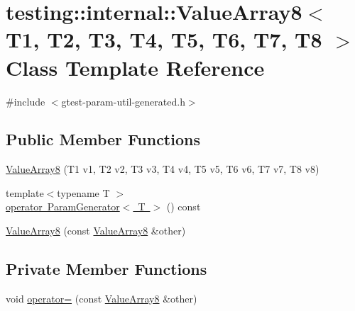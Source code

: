 \hypertarget{classtesting_1_1internal_1_1_value_array8}{}\section{testing\+::internal\+::Value\+Array8$<$ T1, T2, T3, T4, T5, T6, T7, T8 $>$ Class Template Reference}
\label{classtesting_1_1internal_1_1_value_array8}


{\ttfamily \#include $<$gtest-\/param-\/util-\/generated.\+h$>$}

\subsection*{Public Member Functions}
\begin{DoxyCompactItemize}
\item 
\mbox{\hyperlink{classtesting_1_1internal_1_1_value_array8_aa935d771149e26694277b6b9a3f6f5d3}{Value\+Array8}} (T1 v1, T2 v2, T3 v3, T4 v4, T5 v5, T6 v6, T7 v7, T8 v8)
\item 
{\footnotesize template$<$typename T $>$ }\\\mbox{\hyperlink{classtesting_1_1internal_1_1_value_array8_a265f6e8bc6ceede7e673682ddebb82c5}{operator Param\+Generator$<$ T $>$}} () const
\item 
\mbox{\hyperlink{classtesting_1_1internal_1_1_value_array8_aa2d57c811dc60c02a487c36b4b6b4464}{Value\+Array8}} (const \mbox{\hyperlink{classtesting_1_1internal_1_1_value_array8}{Value\+Array8}} \&other)
\end{DoxyCompactItemize}
\subsection*{Private Member Functions}
\begin{DoxyCompactItemize}
\item 
void \mbox{\hyperlink{classtesting_1_1internal_1_1_value_array8_a35cb246a13f4f87329d08ec401c6ffff}{operator=}} (const \mbox{\hyperlink{classtesting_1_1internal_1_1_value_array8}{Value\+Array8}} \&other)
\end{DoxyCompactItemize}
